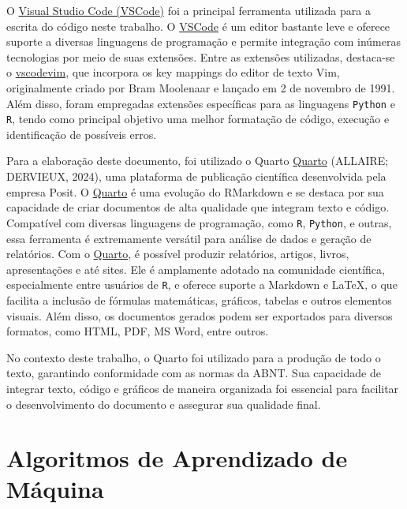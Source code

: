 \documentclass[
  12pt,
  a4paper,
]{scrreprt}
\begin{document}
\vspace{12pt}

O \href{https://code.visualstudio.com/}{Visual Studio Code (VSCode)} foi
a principal ferramenta utilizada para a escrita do código neste
trabalho. O
\href{\%5Bvscodevim\%5D(https://marketplace.visualstudio.com/items?itemName=vscodevim.vim)}{VSCode}
é um editor bastante leve e oferece suporte a diversas linguagens de
programação e permite integração com inúmeras tecnologias por meio de
suas extensões. Entre as extensões utilizadas, destaca-se o
\href{https://marketplace.visualstudio.com/items?itemName=vscodevim.vim}{vscodevim},
que incorpora os key mappings do editor de texto Vim, originalmente
criado por Bram Moolenaar e lançado em 2 de novembro de 1991. Além
disso, foram empregadas extensões específicas para as linguagens
\texttt{Python} e \texttt{R}, tendo como principal objetivo uma melhor
formatação de código, execução e identificação de possíveis erros.

\vspace{12pt}

Para a elaboração deste documento, foi utilizado o Quarto
\href{https://quarto.org/}{Quarto} (ALLAIRE; DERVIEUX, 2024), uma
plataforma de publicação científica desenvolvida pela empresa Posit. O
\href{https://quarto.org/}{Quarto} é uma evolução do RMarkdown e se
destaca por sua capacidade de criar documentos de alta qualidade que
integram texto e código. Compatível com diversas linguagens de
programação, como \texttt{R}, \texttt{Python}, e outras, essa ferramenta
é extremamente versátil para análise de dados e geração de relatórios.
Com o \href{https://quarto.org/}{Quarto}, é possível produzir
relatórios, artigos, livros, apresentações e até sites. Ele é amplamente
adotado na comunidade científica, especialmente entre usuários de
\texttt{R}, e oferece suporte a Markdown e \LaTeX, o que facilita a
inclusão de fórmulas matemáticas, gráficos, tabelas e outros elementos
visuais. Além disso, os documentos gerados podem ser exportados para
diversos formatos, como HTML, PDF, MS Word, entre outros.

\vspace{12pt}

No contexto deste trabalho, o Quarto foi utilizado para a produção de
todo o texto, garantindo conformidade com as normas da ABNT. Sua
capacidade de integrar texto, código e gráficos de maneira organizada
foi essencial para facilitar o desenvolvimento do documento e assegurar
sua qualidade final.

\chapter{Algoritmos de Aprendizado de
Máquina}\label{algoritmos-de-aprendizado-de-muxe1quina}
\end{document}

